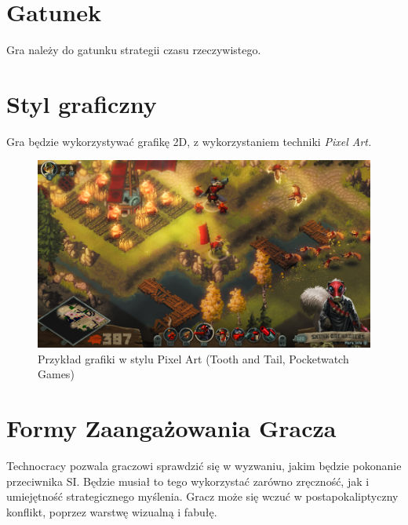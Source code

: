 \documentclass[a4paper]{scrreprt}
\def \GameTiTle{Technocracy}
\begin{document}
\section{Gatunek}
Gra należy do gatunku strategii czasu rzeczywistego.
\section{Styl graficzny}
Gra będzie wykorzystywać grafikę 2D, z wykorzystaniem techniki \emph{Pixel Art.}

\begin{figure}[hb]
\centering
\includegraphics[width=1\textwidth]{ToothAndTail.png}
\caption{\label{fig:arteg1} Przykład grafiki w stylu Pixel Art (Tooth and Tail, Pocketwatch Games)}
\end{figure}



\section{Formy Zaangażowania Gracza}
\GameTiTle{} pozwala graczowi sprawdzić się w wyzwaniu, jakim będzie pokonanie przeciwnika SI. Będzie musiał to tego wykorzystać zarówno zręczność, jak i umiejętność strategicznego myślenia. Gracz może się wczuć w postapokaliptyczny konflikt, poprzez warstwę wizualną i fabułę.
\end{document}
